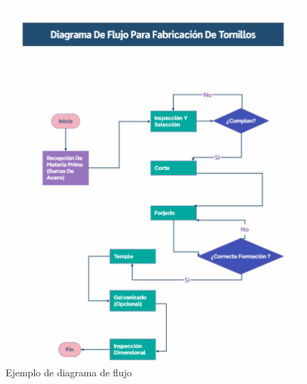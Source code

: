 \documentclass{article}
\theoremstyle{mytheoremstyle}
\theoremstyle{mytheoremstyle}
\theoremstyle{myproblemstyle}
\begin{document}
\begin{enumerate}
\begin{itemize}
		\begin{figure}[H]
			\centering
			\includegraphics[width=\textwidth]{flujotornillos.png}
			\caption[short]{Ejemplo de diagrama de flujo}
			\label{fig:imagen2}
		  \end{figure}

\end{itemize}
\end{enumerate}
\end{document}
